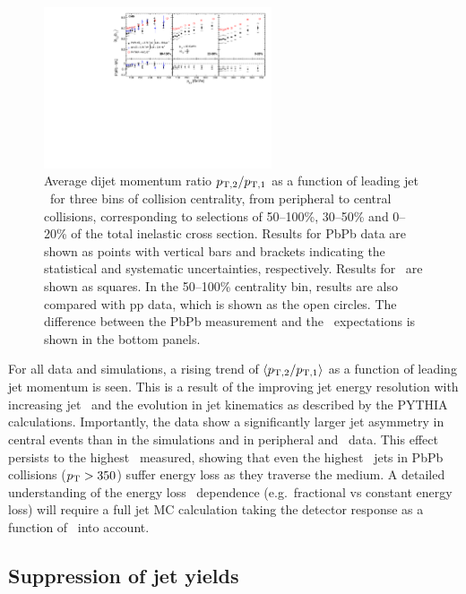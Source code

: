 \begin{figure}[!th]
\begin{center}
\includegraphics[width=0.6\textwidth]{jetfigures/deltaPtOverPt5_lead120_sub30_diff_20120103.pdf}
\caption[]{Average dijet momentum ratio $p_{\rm{T},2}/p_{\rm{T},1}$ as a function of
leading jet \pT\ for three bins of collision centrality, from peripheral to central collisions,
corresponding to selections of 50--100\%,  30--50\% and 0--20\%  of the total inelastic cross section.
Results for PbPb data are shown as points with vertical bars and brackets indicating
the statistical and systematic uncertainties, respectively.  Results for \PYTHYD\ are shown as squares. In the 50--100\% centrality bin,
results are also compared with pp data, which is shown as the open circles.
The difference between the PbPb measurement and the \PYTHYD\ expectations is shown in the bottom panels. }
\label{fig:GR:CMS_pt_ratio}
\end{center}
\end{figure}

For all data and simulations, a rising trend of $\langle p_{\rm{T},2}/p_{\rm{T},1} \rangle$ as a function
of leading jet momentum is seen. This is a result of the improving jet energy resolution
with increasing jet \pT\ and the evolution in jet kinematics as described by the PYTHIA
calculations. Importantly, the data show a significantly larger jet asymmetry in central events
than in the simulations and in peripheral and \pp\ data. This effect persists to the
highest \pT\ measured, showing that even the highest \pT\ jets in PbPb collisions ($\mbox{$p_{\mathrm{T}}$} > 350$\GeVc)
suffer energy loss as they traverse the medium. A detailed understanding of the energy loss
\pT\ dependence (e.g.\ fractional vs constant energy loss) will require a full jet MC calculation
taking the detector response as a function of \pT\ into account.

\subsection{Suppression of jet yields}

